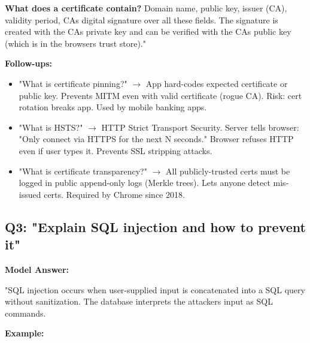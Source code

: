 \documentclass[11pt]{article}
\providecommand{\tightlist}{\setlength{\itemsep}{1pt}\setlength{\parskip}{0pt}}
\begin{document}
\textbf{What does a certificate contain?}
Domain name, public key, issuer (CA), validity period, CA\textquotesingle s digital signature over all these fields. The signature is created with the CA\textquotesingle s private key and can be verified with the CA\textquotesingle s public key (which is in the browser\textquotesingle s trust store)."

\textbf{Follow-ups:}

\begin{itemize}
\tightlist
\item
  "What is certificate pinning?" \(\rightarrow\) App hard-codes expected certificate or public key. Prevents MITM even with valid certificate (rogue CA). Risk: cert rotation breaks app. Used by mobile banking apps.
\item
  "What is HSTS?" \(\rightarrow\) HTTP Strict Transport Security. Server tells browser: "Only connect via HTTPS for the next N seconds." Browser refuses HTTP even if user types it. Prevents SSL stripping attacks.
\item
  "What is certificate transparency?" \(\rightarrow\) All publicly-trusted certs must be logged in public append-only logs (Merkle trees). Lets anyone detect mis-issued certs. Required by Chrome since 2018.
\end{itemize}

\subsection{Q3: "Explain SQL injection and how to prevent it"}\label{q3-explain-sql-injection-and-how-to-prevent-it}

\textbf{Model Answer:}

"SQL injection occurs when user-supplied input is concatenated into a SQL query without sanitization. The database interprets the attacker\textquotesingle s input as SQL commands.

\textbf{Example:}

\end{document}
